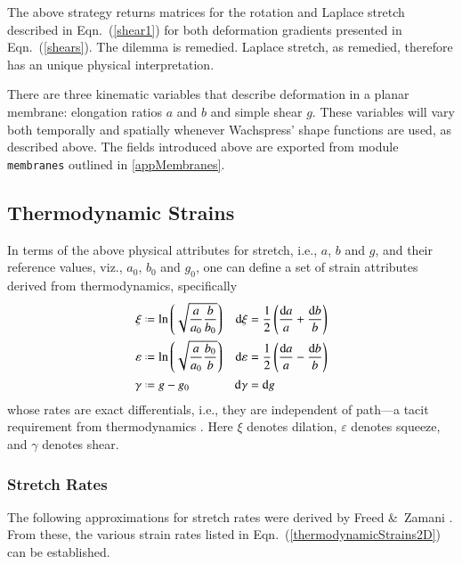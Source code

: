 The above strategy returns matrices for the rotation and Laplace stretch described in Eqn.~(\ref{shear1}) for both deformation gradients presented in Eqn.~(\ref{shears}). The dilemma is remedied.  Laplace stretch, as remedied, therefore has an unique physical interpretation.

There are three kinematic variables that describe deformation in a planar membrane: elongation ratios $a$ and $b$ and simple shear $g$.  These variables will vary both temporally and spatially whenever Wachspress' shape functions are used, as described above.  The fields introduced above are exported from module \texttt{membranes} outlined in \ref{appMembranes}.

\subsection{Thermodynamic Strains}

In terms of the above physical attributes for stretch, i.e., $a$, $b$ and $g$, and their reference values, viz., $a_0$, $b_0$ and $g_0$, one can define a set of strain attributes derived from thermo\-dynamics, specifically \cite{Freed17}
\begin{subequations}
    \label{thermodynamicStrains2D}
    \begin{align}
    \xi & \defeq \ln \left( \sqrt{\frac{a}{a_0} \frac{b}{b_0}} \right) & 
    \mathrm{d} \xi & = \frac{1}{2} \left( \frac{\mathrm{d}a}{a} + 
    \frac{\mathrm{d}b}{b} \right) \\
    \varepsilon & \defeq \ln \left( \sqrt{\frac{a}{a_0} \frac{b_0}{b}} \right) &
    \mathrm{d} \varepsilon & = \frac{1}{2} \left( \frac{\mathrm{d}a}{a} - 
    \frac{\mathrm{d}b}{b} \right) \\
    \gamma & \defeq g - g_0 & 
    \mathrm{d} \gamma & = \mathrm{d} g
    \end{align}
\end{subequations}
whose rates are exact differentials, i.e., they are independent of path---a tacit requirement from thermo\-dynamics \cite{Caratheodory09}.  Here $\xi$ denotes dilation, $\varepsilon$ denotes squeeze, and $\gamma$ denotes shear. 

\subsubsection{Stretch Rates}

The following approximations for stretch rates were derived by Freed \&\ Zamani \cite{FreedZamani18}.  From these, the various strain rates listed in Eqn.~(\ref{thermodynamicStrains2D}) can be established.  

